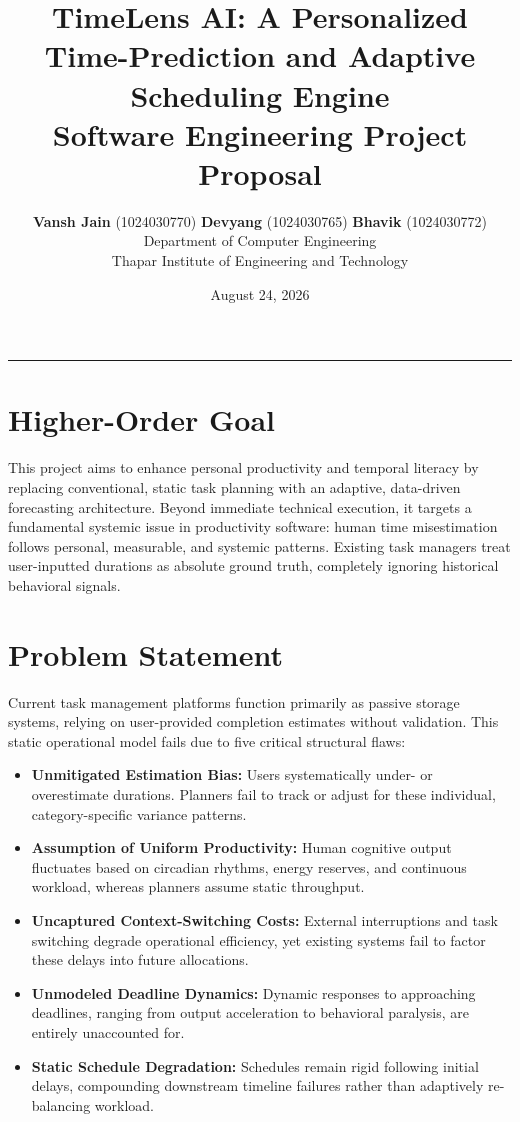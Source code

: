 \documentclass[11pt,a4paper]{article}
\title{\textbf{\Large TimeLens AI: A Personalized Time-Prediction and Adaptive Scheduling Engine}\\[0.3em]
\large Software Engineering Project Proposal}
\author{
    \textbf{Vansh Jain} (1024030770) \quad 
    \textbf{Devyang} (1024030765) \quad 
    \textbf{Bhavik} (1024030772)\\[0.5em]
    \small Department of Computer Engineering\\
    \small Thapar Institute of Engineering and Technology
}
\date{August 24, 2026}
\begin{document}
\maketitle
\hrule
\vspace{1.5em}

\section{Higher-Order Goal}
This project aims to enhance personal productivity and temporal literacy by replacing conventional, static task planning with an adaptive, data-driven forecasting architecture. Beyond immediate technical execution, it targets a fundamental systemic issue in productivity software: human time misestimation follows personal, measurable, and systemic patterns. Existing task managers treat user-inputted durations as absolute ground truth, completely ignoring historical behavioral signals.

\section{Problem Statement}
Current task management platforms function primarily as passive storage systems, relying on user-provided completion estimates without validation. This static operational model fails due to five critical structural flaws:
\begin{itemize}
    \item \textbf{Unmitigated Estimation Bias:} Users systematically under- or overestimate durations. Planners fail to track or adjust for these individual, category-specific variance patterns.
    \item \textbf{Assumption of Uniform Productivity:} Human cognitive output fluctuates based on circadian rhythms, energy reserves, and continuous workload, whereas planners assume static throughput.
    \item \textbf{Uncaptured Context-Switching Costs:} External interruptions and task switching degrade operational efficiency, yet existing systems fail to factor these delays into future allocations.
    \item \textbf{Unmodeled Deadline Dynamics:} Dynamic responses to approaching deadlines, ranging from output acceleration to behavioral paralysis, are entirely unaccounted for.
    \item \textbf{Static Schedule Degradation:} Schedules remain rigid following initial delays, compounding downstream timeline failures rather than adaptively re-balancing workload.
\end{itemize}
\end{document}
